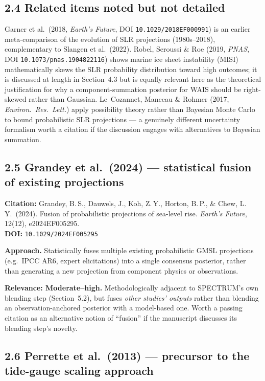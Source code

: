 \documentclass[11pt]{article}
\begin{document}
\subsection*{2.4 Related items noted but not detailed}

Garner et al.\ (2018, \textit{Earth's Future}, DOI
\texttt{10.1029/2018EF000991}) is an earlier meta-comparison of the
evolution of SLR projections (1980s--2018), complementary to Slangen et al.\
(2022). Robel, Seroussi \& Roe (2019, \textit{PNAS}, DOI
\texttt{10.1073/pnas.1904822116}) shows marine ice sheet instability (MISI)
mathematically skews the SLR probability distribution toward high outcomes;
it is discussed at length in Section~4.3 but is equally relevant here as the
theoretical justification for why a component-summation posterior for WAIS
should be right-skewed rather than Gaussian. Le~Cozannet, Manceau \& Rohmer
(2017, \textit{Environ.\ Res.\ Lett.}) apply possibility theory rather than
Bayesian Monte Carlo to bound probabilistic SLR projections --- a genuinely
different uncertainty formalism worth a citation if the discussion engages
with alternatives to Bayesian summation.

\subsection*{2.5 Grandey et al.\ (2024) --- statistical fusion of existing projections}

\noindent\textbf{Citation:} Grandey, B.\,S., Dauwels, J., Koh, Z.\,Y.,
Horton, B.\,P., \& Chew, L.\,Y.\ (2024). Fusion of probabilistic projections
of sea-level rise. \textit{Earth's Future}, 12(12), e2024EF005295.\\
\textbf{DOI:} \texttt{10.1029/2024EF005295}

\noindent\textbf{Approach.} Statistically fuses multiple existing
probabilistic GMSL projections (e.g.\ IPCC AR6, expert elicitations) into a
single consensus posterior, rather than generating a new projection from
component physics or observations.

\noindent\textbf{Relevance: Moderate--high.} Methodologically adjacent to
SPECTRUM's own blending step (Section~5.2), but fuses \emph{other studies'
outputs} rather than blending an observation-anchored posterior with a
model-based one. Worth a passing citation as an alternative notion of
``fusion'' if the manuscript discusses its blending step's novelty.

\subsection*{2.6 Perrette et al.\ (2013) --- precursor to the tide-gauge scaling approach}
\end{document}
